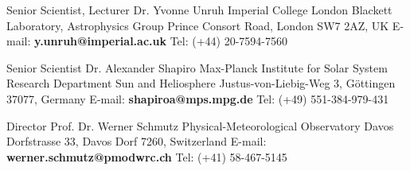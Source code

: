 

\begin{cventries}

  \cventry
    {Senior Scientist, Lecturer} %
    {Dr. Yvonne Unruh} %
    {} %
    {} %
    {Imperial College London\newline
     Blackett Laboratory, Astrophysics Group\newline
     Prince Consort Road, London SW7 2AZ, UK\newline
     E-mail: \textbf{y.unruh@imperial.ac.uk}\newline
     Tel: (+44) 20-7594-7560} %

  \cventry
    {Senior Scientist} %
    {Dr. Alexander Shapiro} %
    {} %
    {} %
    {Max-Planck Institute for Solar System Research\newline
     Department Sun and Heliosphere\newline
     Justus-von-Liebig-Weg 3, G{\"o}ttingen 37077, Germany\newline
     E-mail: \textbf{shapiroa@mps.mpg.de}\newline
     Tel: (+49) 551-384-979-431} %

  \cventry
    {Director} %
    {Prof. Dr. Werner Schmutz} %
    {} %
    {} %
    {Physical-Meteorological Observatory Davos\newline
     Dorfstrasse 33, Davos Dorf 7260, Switzerland\newline
     E-mail: \textbf{werner.schmutz@pmodwrc.ch}\newline
     Tel: (+41) 58-467-5145} %

\end{cventries}
